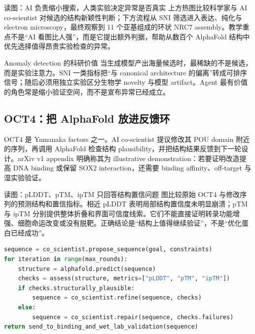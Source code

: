 
\begin{knowledgebox}{读图：AI 负责缩小搜索，人类实验决定异常是否真实}
上方热图比较科学家与 AI co-scientist 对候选的结构新颖性判断；下方流程从 SNI 筛选进入表达、纯化与 electron microscopy，最终观察到 11 个亚基组成的环状 NRC7 assembly。教学重点不是“AI 看图比人强”，而是它提出额外判据，帮助从数百个 AlphaFold 结构中优先选择值得昂贵实验检查的异常。
\end{knowledgebox}

\begin{importantbox}{Anomaly detection 的科研价值}
当生成模型产出海量候选时，最稀缺的不是候选，而是实验注意力。SNI 一类指标把“与 canonical architecture 的偏离”转成可排序信号；随后必须用独立实验区分生物学 novelty 与模型 artifact。Agent 最有价值的角色常是缩小验证空间，而不是宣布异常已经成立。
\end{importantbox}

\subsection{OCT4：把 AlphaFold 放进反馈环}

OCT4 是 Yamanaka factors 之一。AI co-scientist 提议修改其 POU domain 附近的序列，再调用 AlphaFold 检查结构 plausibility，并把结构结果反馈到下一轮设计。arXiv v1 appendix 明确称其为 illustrative demonstration：若要证明改造提高 DNA binding 或保留 SOX2 interaction，还需要 binding affinity、off-target 与湿实验验证。


\begin{knowledgebox}{读图：pLDDT、pTM、ipTM 只回答结构置信问题}
图比较原始 OCT4 与修改序列的预测结构和置信指标。相近 pLDDT 表明局部结构置信度未明显崩溃；pTM 与 ipTM 分别提供整体折叠和界面可信度线索。它们不能直接证明转录功能增强、细胞命运改变或没有脱靶。正确结论是“结构上值得继续验证”，不是“优化蛋白已经成功”。
\end{knowledgebox}

\begin{lstlisting}[language=Python,caption={专门模型进入假设设计反馈环的概念流程}]
sequence = co_scientist.propose_sequence(goal, constraints)
for iteration in range(max_rounds):
    structure = alphafold.predict(sequence)
    checks = assess(structure, metrics=["pLDDT", "pTM", "ipTM"])
    if checks.structurally_plausible:
        sequence = co_scientist.refine(sequence, checks)
    else:
        sequence = co_scientist.repair(sequence, checks.failures)
return send_to_binding_and_wet_lab_validation(sequence)
\end{lstlisting}

